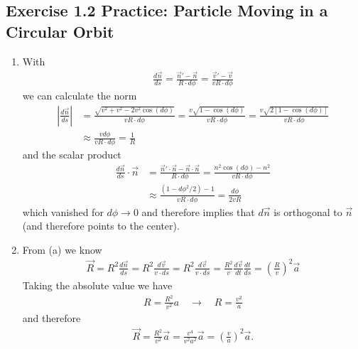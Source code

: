 \documentclass[../main.tex]{subfiles}
\begin{document}
\subsection{Exercise 1.2 Practice: Particle Moving in a Circular Orbit}
\begin{enumerate}[label=(\alph*)]
\item With
\begin{align}
    \frac{d\vec{n}}{ds}
    =\frac{\vec{n}'-\vec{n}}{R\cdot d\phi}=\frac{\vec{v}'-\vec{v}}{vR\cdot d\phi}
\end{align}
we can calculate the norm
\begin{align}
    \left|\frac{d\vec{n}}{ds}\right|
    &=\frac{\sqrt{v^2+v^2-2v^2\cos(d\phi)}}{vR\cdot d\phi}
    =\frac{v\sqrt{1-\cos(d\phi)}}{vR\cdot d\phi}
    = \frac{v\sqrt{2[1-\cos(d\phi)]}}{vR\cdot d\phi}\\
    &\approx\frac{vd\phi}{vR\cdot d\phi}=\frac{1}{R}
\end{align}
and the scalar product
\begin{align}
    \frac{d\vec{n}}{ds}\cdot\vec{n}
    &=\frac{\vec{n}'\cdot\vec{n}-\vec{n}\cdot\vec{n}}{R\cdot d\phi}=\frac{n^2\cos(d\phi)-n^2}{vR\cdot d\phi}\\
    &\approx \frac{(1-d\phi^2/2)-1}{vR\cdot d\phi}=\frac{d\phi}{2vR}
\end{align}
which vanished for $d\phi\rightarrow0$ and therefore implies that $d\vec{n}$ is orthogonal to $\vec{n}$ (and therefore points to the center).
\item From (a) we know
\begin{align}
    \vec{R}=R^2\frac{d\vec{n}}{ds}
    =R^2\frac{d\vec{v}}{v\cdot ds}
    =R^2\frac{d\vec{v}}{v\cdot ds}
    =\frac{R^2}{v}\frac{d\vec{v}}{dt}\frac{dt}{ds}
    =\left(\frac{R}{v}\right)^2\vec{a}
\end{align}
Taking the absolute value we have
\begin{align}
    R=\frac{R^2}{v^2}a\quad\rightarrow\quad R=\frac{v^2}{a}
\end{align}
and therefore
\begin{align}
    \vec{R}=\frac{R^2}{v^2}\vec{a}=\frac{v^4}{v^2 a^2}\vec{a}=\left(\frac{v}{a}\right)^2\vec{a}.
\end{align}
\end{enumerate}
\end{document}
